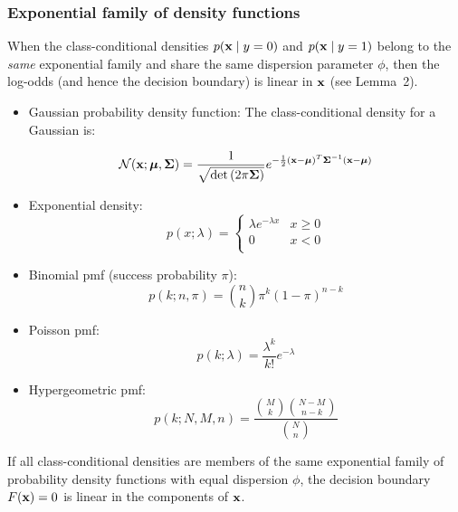   \subsubsection{Exponential family of density functions}
  
  When the class-conditional densities $p(\bm{\mathrm{x}}\mid y=0)$ and $p(\bm{\mathrm{x}}\mid y=1)$ belong to the \emph{same} exponential family and share the same dispersion parameter $\phi$, then the log-odds (and hence the decision boundary) is linear in $\bm{\mathrm{x}}$ (see Lemma~2).
  
  \begin{itemize}
      \item {Gaussian probability density function:}
      The class-conditional density for a Gaussian is:
      
     \begin{displaymath}
    \mathcal{N}(\bm{\mathrm{x}}; \bm{\mathrm{\mu}},\mathbf{\Sigma}) = \frac{1}{ \sqrt{ \det{(2 \pi \ensuremath{\mathbf{\Sigma}})} } }
                    e^{-\frac{1}{2} (\bm{\mathrm{x}} - \bm{\mathrm{\mu}})^T \mathbf{\Sigma}^{-1} (\bm{\mathrm{x}} - \bm{\mathrm{\mu}})  } 
  \end{displaymath}
  \item {Exponential density:}
   \begin{displaymath}
    p(x;\lambda) = \left\{ 
                 \begin{array}{ll}
                   \lambda e^{-\lambda x} & x \ge 0 \\
                   0                      & x < 0 \\
                 \end{array}
               \right.
  \end{displaymath}
  \item {Binomial pmf (success probability $\pi$):}
  \begin{displaymath}
    p(k;n,\pi) = \binom{n}{k} \pi^k (1-\pi)^{n-k}
  \end{displaymath}
  \item {Poisson pmf:}
  \begin{displaymath}
    p(k;\lambda) = \frac{\lambda^k}{k!} e^{-\lambda}
  \end{displaymath}
  \item {Hypergeometric pmf:}
  \begin{displaymath}
    p(k;N,M,n) = \frac{\binom{M}{k}\binom{N-M}{n-k}}{\binom{N}{n}}
  \end{displaymath}
  \end{itemize}

   \begin{lemma}
     If all class-conditional densities are members of the same exponential family of probability density functions with equal dispersion $\phi$, the decision boundary $F(\bm{\mathrm{x}})=0$ is linear in the components of $\bm{\mathrm{x}}$.
   \end{lemma}
   

